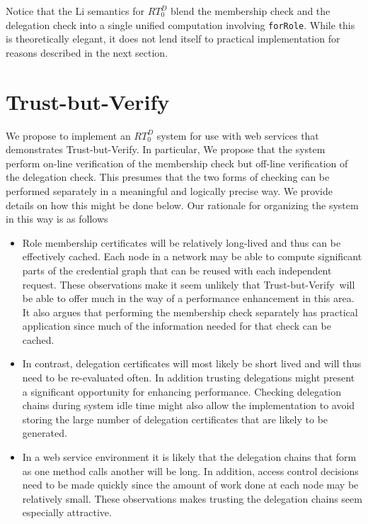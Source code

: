 \documentclass{article}
\newcommand{\TbV}{Trust-but-Verify}
\newcommand{\predicate}[1]{\texttt{#1}}
\begin{document}
Notice that the Li semantics for $RT_0^D$ blend the membership check and the delegation check
into a single unified computation involving \predicate{forRole}. While this is theoretically
elegant, it does not lend itself to practical implementation for reasons described in the next
section.

\section{\TbV}
\label{sec:TbV}

We propose to implement an $RT_0^D$ system for use with web services that demonstrates \TbV. In
particular, We propose that the system perform on-line verification of the membership check but
off-line verification of the delegation check. This presumes that the two forms of checking can
be performed separately in a meaningful and logically precise way. We provide details on how
this might be done below. Our rationale for organizing the system in this way is as follows

\begin{itemize}

\item Role membership certificates will be relatively long-lived and thus can be effectively
  cached. Each node in a network may be able to compute significant parts of the credential
  graph that can be reused with each independent request. These observations make it seem
  unlikely that \TbV\ will be able to offer much in the way of a performance enhancement in this
  area. It also argues that performing the membership check separately has practical application
  since much of the information needed for that check can be cached.

\item In contrast, delegation certificates will most likely be short lived and will thus need to
  be re-evaluated often. In addition trusting delegations might present a significant
  opportunity for enhancing performance. Checking delegation chains during system idle time
  might also allow the implementation to avoid storing the large number of delegation
  certificates that are likely to be generated.

\item In a web service environment it is likely that the delegation chains that form as one
  method calls another will be long. In addition, access control decisions need to be made
  quickly since the amount of work done at each node may be relatively small. These observations
  makes trusting the delegation chains seem especially attractive.

\end{itemize}
\end{document}
